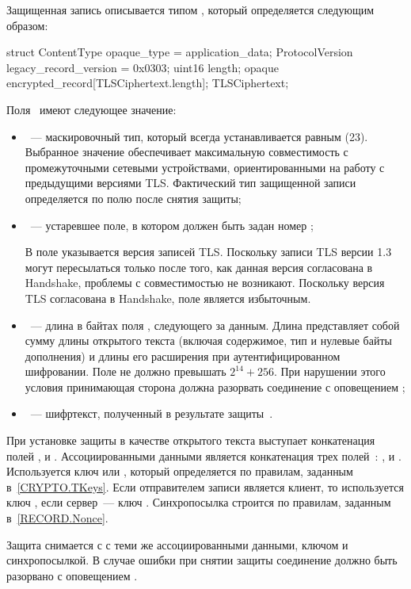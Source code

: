 Защищенная запись описывается типом , который
определяется следующим образом:
\begin{codeblock}
struct {
  ContentType opaque_type = application_data;
  ProtocolVersion legacy_record_version = 0x0303;
  uint16 length;
  opaque encrypted_record[TLSCiphertext.length];
} TLSCiphertext;
\end{codeblock}

Поля~ имеют следующее значение:
\begin{itemize}
\item
{}~--- маскировочный тип, который всегда устанавливается
равным  (23). Выбранное значение обеспечивает
максимальную совместимость с промежуточными сетевыми устройствами,
ориентированными на работу с предыдущими версиями TLS. Фактический тип
защищенной записи определяется по полю  после
снятия защиты;

\item
{}~--- устаревшее поле, в котором должен быть 
задан номер ;

\begin{note*}
В поле указывается версия записей TLS. Поскольку записи TLS версии 1.3 могут 
пересылаться только после того, как данная версия согласована в Handshake, 
проблемы с совместимостью не возникают. Поскольку версия TLS согласована в 
Handshake, поле является избыточным.
\end{note*}

\item
{}~--- длина в байтах поля , 
следующего за данным. Длина представляет собой сумму длины открытого текста
(включая содержимое, тип и нулевые байты дополнения) и длины его 
расширения при аутентифицированном шифровании. Поле   
не должно превышать $2^{14}+256$. При нарушении этого условия принимающая 
сторона должна разорвать соединение с оповещением 
;

\item
{}~--- шифртекст, полученный в результате 
защиты~.
\end{itemize}

При установке защиты  в качестве открытого текста 
выступает конкатенация полей ,  и .
%
Ассоциированными данными является конкатенация трех 
полей~: , 
и .
%
Используется ключ  или , который 
определяется по правилам, заданным в~\ref{CRYPTO.TKeys}. Если 
отправителем записи является клиент, то используется ключ 
, если сервер~--- ключ .
%
Синхропосылка строится по правилам, заданным в~\ref{RECORD.Nonce}.

Защита снимается с  с теми же 
ассоциированными данными, ключом и синхропосылкой.
%
В случае ошибки при снятии защиты соединение должно быть разорвано с 
оповещением .

